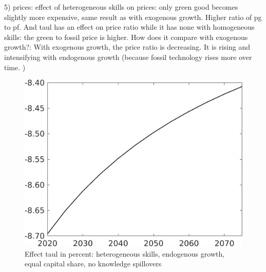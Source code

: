 \documentclass[12pt]{article}
\begin{document}
5) prices: effect of heterogeneous skills on prices: only green good becomes slightly more expensive, same result as with exogenous growth. Higher ratio of pg to pf. And taul has an effect on price ratio while it has none with homogeneous skills: the green to fossil price is higher. How does it compare with exogenous growth?: With exogenous growth, the price ratio is decreasing. It is rising and intensifying with endogenous growth (because fossil technology rises more over time. )
 
\begin{figure}[h!!]
	\centering
	\caption{Effect taul in percent: heterogeneous skills, endogenous growth, equal capital share, no knowledge spillovers }\label{fig:LF_BAU_nsk0_xgr0_equalcapShare_noknow}
	\begin{minipage}[]{0.32\textwidth}
		\includegraphics[width=1\textwidth]{../../codding_model/own_basedOnFried/optimalPol_010922_revision/figures/all_13Sept22/CompTaul_Equlab_LFBAUPer_Reg0_Emnet_spillover0_nsk0_xgr0_knspil1_sep1_countec0_GovRev0_etaa0.79.png}
	\end{minipage}	
\begin{minipage}[]{0.32\textwidth}

\end{minipage}
\end{figure}
\end{document}
